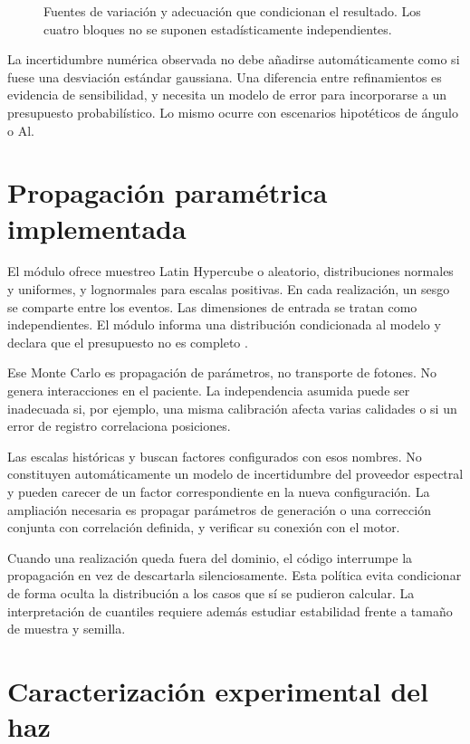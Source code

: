 \begin{figure}[htbp]\centering
\caption{Fuentes de variación y adecuación que condicionan el resultado. Los cuatro bloques no se suponen estadísticamente independientes.}\end{figure}

La incertidumbre numérica observada no debe añadirse automáticamente como si fuese una desviación estándar gaussiana. Una diferencia entre refinamientos es evidencia de sensibilidad, y necesita un modelo de error para incorporarse a un presupuesto probabilístico. Lo mismo ocurre con escenarios hipotéticos de ángulo o Al.

\section{Propagación paramétrica implementada}
El módulo  ofrece muestreo Latin Hypercube o aleatorio, distribuciones normales y uniformes, y lognormales para escalas positivas. En cada realización, un sesgo se comparte entre los eventos. Las dimensiones de entrada se tratan como independientes. El módulo informa una distribución condicionada al modelo y declara que el presupuesto no es completo \citep{jcgm101}.

Ese Monte Carlo es propagación de parámetros, no transporte de fotones. No genera interacciones en el paciente. La independencia asumida puede ser inadecuada si, por ejemplo, una misma calibración afecta varias calidades o si un error de registro correlaciona posiciones.

Las escalas históricas  y  buscan factores configurados con esos nombres. No constituyen automáticamente un modelo de incertidumbre del proveedor espectral y pueden carecer de un factor correspondiente en la nueva configuración. La ampliación necesaria es propagar parámetros de generación o una corrección conjunta con correlación definida, y verificar su conexión con el motor.

Cuando una realización queda fuera del dominio, el código interrumpe la propagación en vez de descartarla silenciosamente. Esta política evita condicionar de forma oculta la distribución a los casos que sí se pudieron calcular. La interpretación de cuantiles requiere además estudiar estabilidad frente a tamaño de muestra y semilla.

\section{Caracterización experimental del haz}
